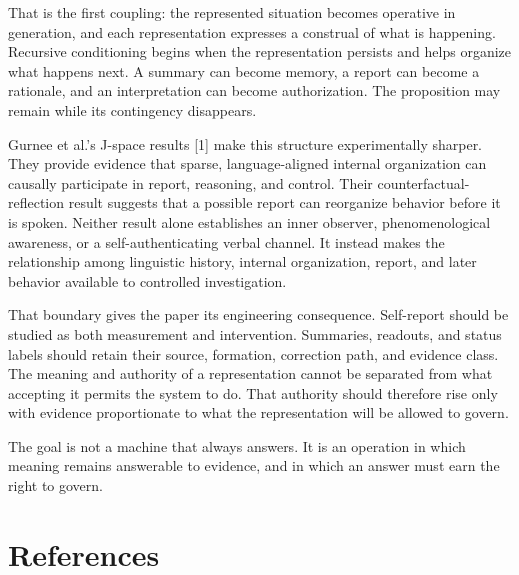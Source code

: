 \documentclass[12pt]{article}
\begin{document}
That is the first coupling: the represented situation becomes operative in generation, and each representation expresses a construal of what is happening. Recursive conditioning begins when the representation persists and helps organize what happens next. A summary can become memory, a report can become a rationale, and an interpretation can become authorization. The proposition may remain while its contingency disappears.

Gurnee et al.'s J-space results {[}1{]} make this structure experimentally sharper. They provide evidence that sparse, language-aligned internal organization can causally participate in report, reasoning, and control. Their counterfactual-reflection result suggests that a possible report can reorganize behavior before it is spoken. Neither result alone establishes an inner observer, phenomenological awareness, or a self-authenticating verbal channel. It instead makes the relationship among linguistic history, internal organization, report, and later behavior available to controlled investigation.

That boundary gives the paper its engineering consequence. Self-report should be studied as both measurement and intervention. Summaries, readouts, and status labels should retain their source, formation, correction path, and evidence class. The meaning and authority of a representation cannot be separated from what accepting it permits the system to do. That authority should therefore rise only with evidence proportionate to what the representation will be allowed to govern.

The goal is not a machine that always answers. It is an operation in which meaning remains answerable to evidence, and in which an answer must earn the right to govern.

\section{References}\label{references}
\end{document}
